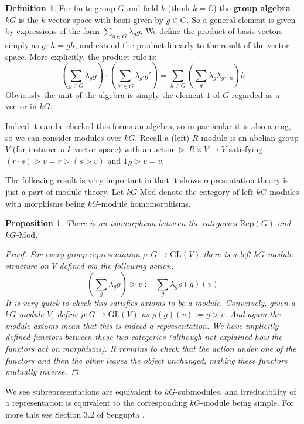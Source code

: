 \documentclass[11pt]{article}
\newcommand{\bb}{\medbreak}
\newcommand{\nt}{\noindent}
\newcommand{\Cc}{\mathbb{C}}
\newcommand{\rt}{\xrightarrow{}}
\newcommand{\cd}{\cdot}
\newcommand{\GL}{\text{GL}}
\newcommand{\Rep}{\text{Rep}}
\newcommand{\Mod}{\text{Mod}}
\newcommand{\define}[1]{\textbf{#1}}
\newtheorem{proposition}[lemma]{Proposition}
\theoremstyle{definition}
\newtheorem{definition}[lemma]{Definition}
\begin{document}
\begin{definition} For finite group $G$ and field $k$ (think $k=\Cc$) the \define{group algebra} $kG$ is the $k$-vector space with basis given by $g\in G$. So a general element is given by expressions of the form $\sum_{g\in G}\lambda_g g$. We define the product of basis vectors simply as $g\cd h=gh$, and extend the product linearly to the result of the vector space. More explicitly, the product rule is:
$$(\sum_{g\in G} \lambda_g g)\cd (\sum_{g'\in G} \lambda_{g'}g')=\sum_{h\in G}(\sum_g \lambda_g \lambda_{g^{-1}h})h$$
Obviously the unit of the algebra is simply the element $1$ of $G$ regarded as a vector in $kG$.
\end{definition}
\nt Indeed it can be checked this forms an algebra, so in particular it is also a ring, so we can consider modules over $kG$. Recall a (left) $R$-module is an abelian group $V$ (for instance a $k$-vector space) with an action $\rhd:R\times V\rt V$ satisfying $(r\cd s)\rhd v=r\rhd (s\rhd v)$ and $1_R\rhd v=v$.\bb

\nt The following result is very important in that it shows representation theory is just a part of module theory. Let $kG$-$\Mod$ denote the category of left $kG$-modules with morphisms being $kG$-module homomorphisms.

\begin{proposition} There is an isomorphism between the categories $\Rep(G)$ and $kG$-$\Mod$.
\begin{proof}
For every group representation $\rho:G\rt \GL(V)$ there is a left $kG$-module structure on $V$ defined via the following action: 
$$(\sum_g \lambda_g g)\rhd v:= \sum_g \lambda_g \rho(g)(v)$$
It is very quick to check this satisfies axioms to be a module. Conversely, given a $kG$-module $V$, define $\rho:G\rt \GL(V)$ as $\rho(g)(v):=g\rhd v$. And again the module axioms mean that this is indeed a representation. We have implicitly defined functors between these two categories (although not explained how the functors act on morphisms). It remains to check that the action under one of the functors and then the other leaves the object unchanged, making these functors mutually inverse.
\end{proof}  
\end{proposition}
\nt We see subrepresentations are equivalent to $kG$-submodules, and irreducibility of a representation is equivalent to the corresponding $kG$-module being simple. For more this see Section 3.2 of Sengupta \cite{alma9956076580001631}.
\end{document}
